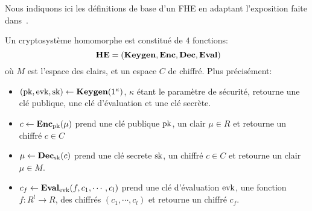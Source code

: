 

Nous indiquons ici les définitions de base d'un FHE en adaptant
l'exposition faite dans~\cite{halevi}.

\begin{definition}
Un cryptosystème homomorphe est constitué de $4$ fonctions:
\[ \text{\textbf{HE}} = (\Keygen, \Enc, \Dec, \Eval)\]
où $M$ est  l'espace des clairs, et un espace $C$ de chiffré. Plus précisément:
\begin{itemize}
\item $(\text{pk}, \text{evk}, \text{sk}) \leftarrow \text{\textbf{Keygen}}(1^\kappa)$, $\kappa$ étant le paramètre de sécurité, retourne une clé publique, une clé d'évaluation et une clé secrète.
\item $c \leftarrow \text{\textbf{Enc}}_{\text{pk}}(\mu)$ prend une clé publique $\text{pk}$, un clair $\mu \in R$ et retourne un chiffré $c\in C$
\item $\mu \leftarrow \text{\textbf{Dec}}_{\text{sk}}(c)$ prend une clé secrete $\text{sk}$, un chiffré $c \in C$ et retourne un clair $\mu \in M$.
\item $c_f \leftarrow \text{\textbf{Eval}}_{\text{evk}}(f, c_1,\cdots,c_l)$ prend une clé d'évaluation
$\text{evk}$, une fonction $f: R^l \rightarrow R$, des chiffrés $(c_1, \cdots, c_l)$ et retourne un chiffré $c_f$.
\end{itemize}
\begin{definition}






\end{definition}
\end{definition}
